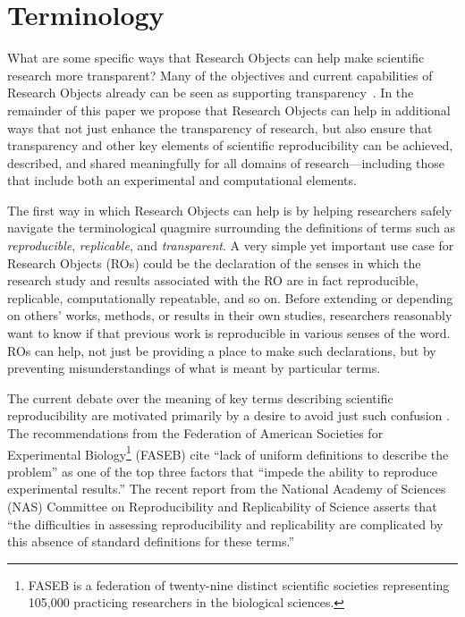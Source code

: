 \section{Terminology}\label{sec-terminology}

What are some specific ways that Research Objects \cite{bechhofer2013whya} can help 
	make scientific research more transparent?  
Many of the objectives and current capabilities of Research Objects already can be seen as supporting
	transparency~\cite{mecum2018preservingc,DBLP:conf/eScience/2018}. 
In the remainder of this paper we propose that Research Objects can help in additional ways that not
	just enhance the transparency of research, but also ensure that transparency and other key elements
	of scientific reproducibility can be achieved, described, and shared meaningfully for all domains
	of research---including those that include both an experimental and computational elements.

The first way in which Research Objects can help is by helping researchers safely navigate the 
	terminological quagmire surrounding the definitions of terms such as \emph{reproducible},
	\emph{replicable}, and \emph{transparent}.
A very simple yet important use case for Research Objects (ROs) could be the declaration of the senses in
	which the research study and results associated with the RO are in fact reproducible, replicable,
	computationally repeatable, and so on.
Before extending or depending on others' works, methods, or results in their own studies, researchers
	reasonably want to know if that previous work is reproducible in various senses of the word.
ROs can help, not just be providing a place to make such declarations, but by preventing
	misunderstandings of what is meant by particular terms.

The current debate over the meaning of key terms describing 
	scientific reproducibility are motivated primarily by a desire to avoid just such confusion \cite{drummond2009replicability,goodman2016what,rauber16primad,herouxtoward,plesser2018reproducibility,barba2018terminologies,committeeonreproducibilityandreplicabilityinscience2019reproducibility}.
The recommendations from the Federation of
	American Societies for Experimental Biology\footnote{FASEB is a federation of twenty-nine distinct scientific societies representing 105,000 
	practicing researchers in the biological sciences.} 
	(FASEB) 
	\cite{FASEB2016enhancing} cite ``lack of uniform definitions to describe the problem''
	as one of the top three factors that ``impede the ability to reproduce experimental results.''
 The recent report from the National Academy of Sciences (NAS) Committee on Reproducibility and Replicability of Science \cite{committeeonreproducibilityandreplicabilityinscience2019reproducibility} asserts
	that ``the difficulties in assessing reproducibility and replicability are complicated by this absence of
	standard definitions for these terms.''


